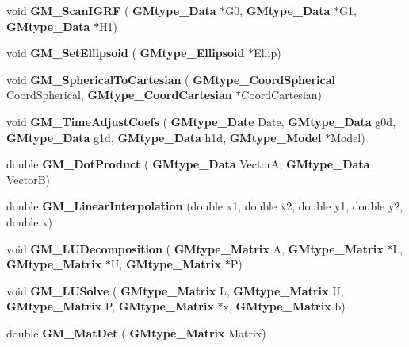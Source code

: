 \begin{DoxyCompactItemize}
\item 
\mbox{\label{_g_m___sub_library_8c_ad399d8d31962b7260e9d20677f1b9698}} 
void {\bfseries G\+M\+\_\+\+Scan\+I\+G\+RF} (\textbf{ G\+Mtype\+\_\+\+Data} $\ast$G0, \textbf{ G\+Mtype\+\_\+\+Data} $\ast$G1, \textbf{ G\+Mtype\+\_\+\+Data} $\ast$H1)
\item 
\mbox{\label{_g_m___sub_library_8c_a3b4094e8784a209b98005937b4edb3b5}} 
void {\bfseries G\+M\+\_\+\+Set\+Ellipsoid} (\textbf{ G\+Mtype\+\_\+\+Ellipsoid} $\ast$Ellip)
\item 
\mbox{\label{_g_m___sub_library_8c_a879dc73dc264b8c170b0ed766bc519df}} 
void {\bfseries G\+M\+\_\+\+Spherical\+To\+Cartesian} (\textbf{ G\+Mtype\+\_\+\+Coord\+Spherical} Coord\+Spherical, \textbf{ G\+Mtype\+\_\+\+Coord\+Cartesian} $\ast$Coord\+Cartesian)
\item 
\mbox{\label{_g_m___sub_library_8c_a2b8976c38bf6d44678d759ce47087a5e}} 
void {\bfseries G\+M\+\_\+\+Time\+Adjust\+Coefs} (\textbf{ G\+Mtype\+\_\+\+Date} Date, \textbf{ G\+Mtype\+\_\+\+Data} g0d, \textbf{ G\+Mtype\+\_\+\+Data} g1d, \textbf{ G\+Mtype\+\_\+\+Data} h1d, \textbf{ G\+Mtype\+\_\+\+Model} $\ast$Model)
\item 
\mbox{\label{_g_m___sub_library_8c_a15d3c2916dc9954a0229037e0f366df9}} 
double {\bfseries G\+M\+\_\+\+Dot\+Product} (\textbf{ G\+Mtype\+\_\+\+Data} VectorA, \textbf{ G\+Mtype\+\_\+\+Data} VectorB)
\item 
\mbox{\label{_g_m___sub_library_8c_a6e62cc8e47107b587dee850194d991d4}} 
double {\bfseries G\+M\+\_\+\+Linear\+Interpolation} (double x1, double x2, double y1, double y2, double x)
\item 
\mbox{\label{_g_m___sub_library_8c_a6ff38253ecaaad2203404103c7c30cea}} 
void {\bfseries G\+M\+\_\+\+L\+U\+Decomposition} (\textbf{ G\+Mtype\+\_\+\+Matrix} A, \textbf{ G\+Mtype\+\_\+\+Matrix} $\ast$L, \textbf{ G\+Mtype\+\_\+\+Matrix} $\ast$U, \textbf{ G\+Mtype\+\_\+\+Matrix} $\ast$P)
\item 
\mbox{\label{_g_m___sub_library_8c_a61e6a2f04e04a7ae6e6d32987e38fbbc}} 
void {\bfseries G\+M\+\_\+\+L\+U\+Solve} (\textbf{ G\+Mtype\+\_\+\+Matrix} L, \textbf{ G\+Mtype\+\_\+\+Matrix} U, \textbf{ G\+Mtype\+\_\+\+Matrix} P, \textbf{ G\+Mtype\+\_\+\+Matrix} $\ast$x, \textbf{ G\+Mtype\+\_\+\+Matrix} b)
\item 
\mbox{\label{_g_m___sub_library_8c_ae04ee2ffa850da9c22adaaf344c3bed0}} 
double {\bfseries G\+M\+\_\+\+Mat\+Det} (\textbf{ G\+Mtype\+\_\+\+Matrix} Matrix)
\item 
\mbox{\label{_g_m___sub_library_8c_a8c9fc650496809b50db01f995e34eaff}} 

\end{DoxyCompactItemize}
